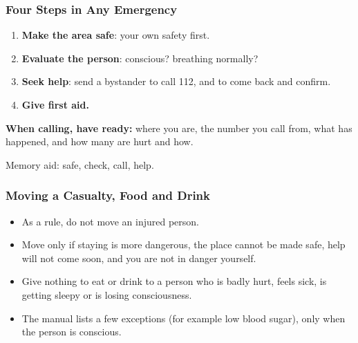 \begin{frame}[fragile]\frametitle{Four Steps in Any Emergency}
    \begin{enumerate}
        \item \textbf{Make the area safe}: your own safety first.
        \item \textbf{Evaluate the person}: conscious? breathing normally?
        \item \textbf{Seek help}: send a bystander to call 112, and to come back and confirm.
        \item \textbf{Give first aid.}
    \end{enumerate}
    \textbf{When calling, have ready:} where you are, the number you call from, what has happened, and how many are hurt and how.

    Memory aid: safe, check, call, help.
\end{frame}

\begin{frame}[fragile]\frametitle{Moving a Casualty, Food and Drink}
    \begin{itemize}
        \item As a rule, do not move an injured person.
        \item Move only if staying is more dangerous, the place cannot be made safe, help will not come soon, and you are not in danger yourself.
        \item Give nothing to eat or drink to a person who is badly hurt, feels sick, is getting sleepy or is losing consciousness.
        \item The manual lists a few exceptions (for example low blood sugar), only when the person is conscious.
    \end{itemize}
\end{frame}


